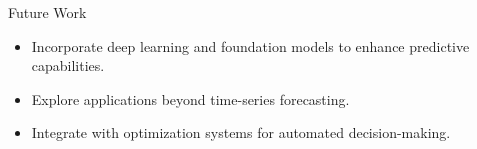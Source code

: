 \documentclass[spanish]{beamer}
\begin{document}
\begin{frame}{Future Work}
	\begin{block}{}
		\begin{itemize}[<+->]
			\item Incorporate deep learning and foundation models to enhance predictive capabilities.
			\item Explore applications beyond time-series forecasting.
			\item Integrate with optimization systems for automated decision-making.
		\end{itemize}
	\end{block}
\end{frame}




	
\end{document}
